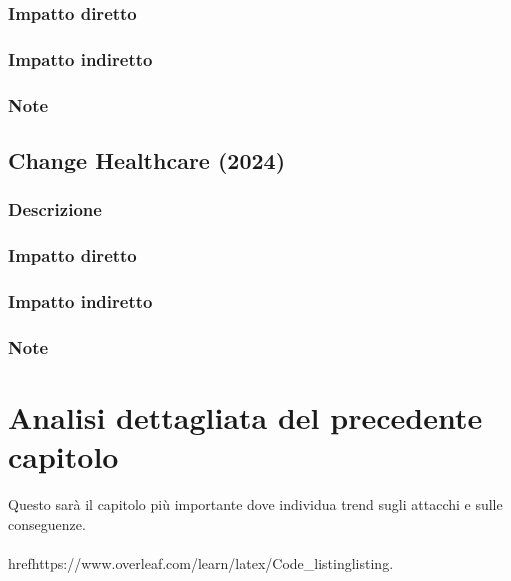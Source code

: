 \documentclass[12pt,a4paper,openright,twoside]{report}
\begin{document}
\subsection{Impatto diretto}

\subsection{Impatto indiretto}

\subsection{Note}
\section{Change Healthcare (2024)}
\subsection{Descrizione}

\subsection{Impatto diretto}

\subsection{Impatto indiretto}

\subsection{Note}

\clearpage{\pagestyle{empty}\cleardoublepage}



\chapter{Analisi dettagliata del precedente capitolo}
Questo sar\`a il capitolo pi\`u importante dove individua trend sugli attacchi e sulle conseguenze.\\
\\href{https://www.overleaf.com/learn/latex/Code\_listing}{listing}.


\clearpage{\pagestyle{empty}\cleardoublepage}



\end{document}

